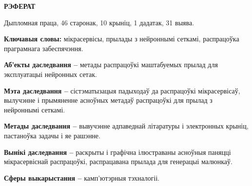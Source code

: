 \begin{center}
  \large\bfseries{РЭФЕРАТ}
\end{center}

Дыпломная праца, 46 старонак, 10 крыніц, 1 дадатак, 31 выява.

\textbf{Ключавыя словы:} мікрасервісы, прылады з нейроннымі сеткамі, распрацоўка праграмнага забеспячэння.

\textbf{Аб'екты даследвання --} метады распрацоўкі маштабуемых прылад для эксплуатацыі нейронных сетак.

\textbf{Мэта даследвання --} сістэматызацыя падыходаў да распрацоўкі мікрасервісаў, вылучэнне і прымяненне асноўных метадаў распрацоўкі для прылад з нейроннымі сеткамі.

\textbf{Метады даследвання --} вывучэнне адпаведнай літаратуры і электронных крыніц, пастаноўка задачы і яе рашэнне.

\textbf{Вынікі даследвання --} раскрыты і графічна ілюстраваны асноўныя паняцці мікрасервіснай распрацоўкі, распрацавана прылада для генерацыі малюнкаў.

\textbf{Сферы выкарыстання --} камп'ютэрныя тэхналогіі.

\newpage